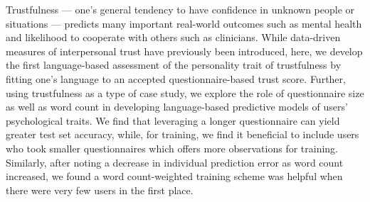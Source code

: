 Trustfulness — one's general tendency to have confidence in unknown people or situations — predicts many important real-world outcomes such as mental health and likelihood to cooperate with others such as clinicians. While data-driven measures  of interpersonal  trust have previously been introduced, here, we develop the first language-based assessment of the personality trait  of trustfulness by fitting one's language to an accepted questionnaire-based trust score. Further, using trustfulness as a type of case study, we explore the role of questionnaire size  as  well as word count in developing language-based predictive models of users' psychological traits. We find that leveraging a longer questionnaire can yield greater test set accuracy, while, for training, we find it beneficial to include users who took smaller questionnaires which offers more observations for training. Similarly, after noting a decrease in individual prediction error as word count increased, we found a word  count-weighted training scheme was helpful when there were very few users in the first place.
